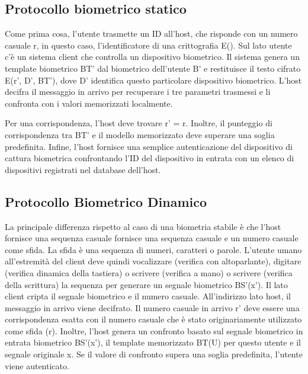 \subsection{Protocollo biometrico statico}
Come prima cosa, l'utente trasmette un ID all'host, che risponde con un numero casuale r, in questo caso, l'identificatore di una crittografia E(). Sul lato utente c'è un sistema client che controlla un dispositivo biometrico. Il sistema genera un template biometrico BT' dal biometrico dell'utente B' e restituisce il testo cifrato E(r', D', BT'), dove D' identifica questo particolare dispositivo biometrico. L'host decifra il messaggio in arrivo per recuperare i tre parametri trasmessi e li confronta con i valori memorizzati localmente.

\singlespacing

Per una corrispondenza, l'host deve trovare r' = r. Inoltre, il punteggio di corrispondenza tra BT' e il modello memorizzato deve superare una soglia predefinita. Infine, l'host fornisce una semplice autenticazione del dispositivo di cattura biometrica confrontando l'ID del dispositivo in entrata con un elenco di dispositivi registrati nel database dell'host.

\subsection{Protocollo Biometrico Dinamico}

La principale differenza rispetto al caso di una biometria stabile è che l'host fornisce una sequenza casuale fornisce una sequenza casuale e un numero casuale come sfida. La sfida è una sequenza di numeri, caratteri o parole. L'utente umano all'estremità del client deve quindi vocalizzare (verifica con altoparlante), digitare (verifica dinamica della tastiera) o scrivere (verifica a mano) o scrivere (verifica della scrittura) la sequenza per generare un segnale biometrico BS'(x'). Il lato client cripta il segnale biometrico e il numero casuale. All'indirizzo lato host, il messaggio in arrivo viene decifrato. Il numero casuale in arrivo r' deve essere una corrispondenza esatta con il numero casuale che è stato originariamente utilizzato come sfida (r). Inoltre, l'host genera un confronto basato sul segnale biometrico in entrata biometrico BS'(x'), il template memorizzato BT(U) per questo utente e il segnale originale x. Se il valore di confronto supera una soglia predefinita, l'utente viene autenticato.